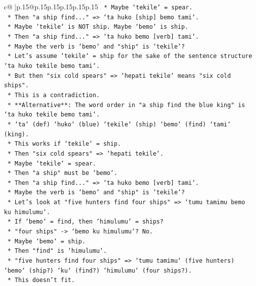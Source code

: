 \documentclass{article}
\begin{document}
{\begin{supertabular}{c@{$\;$}|p{.15\linewidth}@{}p{.15\linewidth}p{.15\linewidth}p{.15\linewidth}p{.15\linewidth}p{.15\linewidth}}
{{{\texttt{        *   Maybe `tekile` = spear.} \\
\texttt{        *   Then "a ship find..." => `ta huko {[}ship{]} bemo tami`.} \\
\texttt{        *   Maybe `tekile` is NOT ship. Maybe `bemo` is ship.} \\
\texttt{        *   Then "a ship find..." => `ta huko bemo {[}verb{]} tami`.} \\
\texttt{        *   Maybe the verb is `bemo` and "ship" is `tekile`?} \\
\texttt{        *   Let's assume `tekile` = ship for the sake of the sentence structure `ta huko tekile bemo tami`.} \\
\texttt{        *   But then "six cold spears" => `hepati tekile` means "six cold ships".} \\
\texttt{        *   This is a contradiction.} \\
\texttt{    *   **Alternative**: The word order in "a ship find the blue king" is `ta huko tekile bemo tami`.} \\
\texttt{        *   `ta` (def) `huko` (blue) `tekile` (ship) `bemo` (find) `tami` (king).} \\
\texttt{        *   This works if `tekile` = ship.} \\
\texttt{        *   Then "six cold spears" => `hepati tekile`.} \\
\texttt{        *   Maybe `tekile` = spear.} \\
\texttt{        *   Then "a ship" must be `bemo`.} \\
\texttt{        *   Then "a ship find..." => `ta huko bemo {[}verb{]} tami`.} \\
\texttt{        *   Maybe the verb is `bemo` and "ship" is `tekile`?} \\
\texttt{        *   Let's look at "five hunters find four ships" => `tumu tamimu bemo ku himulumu`.} \\
\texttt{            *   If `bemo` = find, then `himulumu` = ships?} \\
\texttt{            *   "four ships" {-}> `bemo ku himulumu`? No.} \\
\texttt{            *   Maybe `bemo` = ship.} \\
\texttt{            *   Then "find" is `himulumu`.} \\
\texttt{            *   "five hunters find four ships" => `tumu tamimu` (five hunters) `bemo` (ship?) `ku` (find?) `himulumu` (four ships?).} \\
\texttt{            *   This doesn't fit.} \\
}}}
\end{supertabular}}
\end{document}
